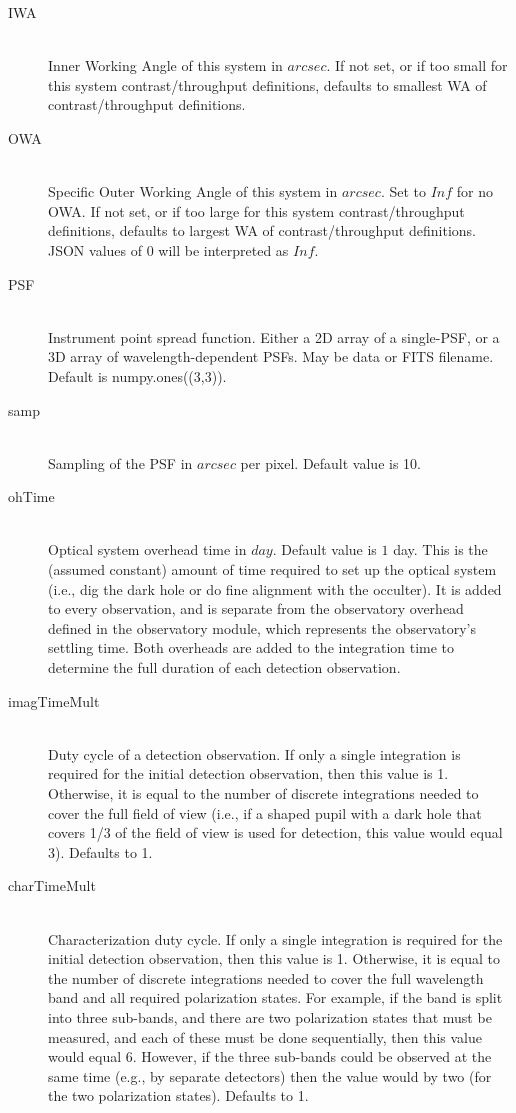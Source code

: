 \documentclass[cleanfoot]{asme2ej}
\begin{document}
\begin{itemize}
\begin{description}
\begin{description}
    \item[IWA] \hfill \\
     Inner Working Angle of this system in $ arcsec $. If not set, or if too small for this system contrast/throughput definitions, defaults to smallest WA of contrast/throughput definitions.
    \item[OWA] \hfill \\
    Specific Outer Working Angle of this system in $ arcsec $. Set to $ Inf $ for no OWA. If not set, or if too large for this system contrast/throughput definitions, defaults to largest WA of contrast/throughput definitions.  JSON values of $ 0 $ will be interpreted as $ Inf $.
    \item[PSF] \hfill \\
    Instrument point spread function. Either a 2D array of a single-PSF, or a 3D array of wavelength-dependent PSFs. May be data or FITS filename. Default is numpy.ones((3,3)).
    \item[samp] \hfill \\
    Sampling of the PSF in $ arcsec $ per pixel. Default value is 10.
    \item[ohTime] \hfill \\
    Optical system overhead time in $ day $.  Default value is $ 1 $ day.  This is the (assumed constant) amount of time required to set up the optical system (i.e., dig the dark hole or do fine alignment with the occulter).  It is added to every observation, and is separate from the observatory overhead defined in the observatory module, which represents the observatory's settling time.  Both overheads are added to the integration time to determine the full duration of each detection observation.
    \item[imagTimeMult]\hfill \\
    Duty cycle of a detection observation.  If only a single integration is required for the initial detection observation, then this value is 1.  Otherwise, it is equal to the number of discrete integrations needed to cover the full field of view (i.e., if a shaped pupil with a dark hole that covers 1/3 of the field of view is used for detection, this value would equal 3).  Defaults to 1.
    \item[charTimeMult]\hfill \\
    Characterization duty cycle.  If only a single integration is required for the initial detection observation, then this value is 1.  Otherwise, it is equal to the number of discrete integrations needed to cover the full wavelength band and all required polarization states.  For example, if the band is split into three sub-bands, and there are two polarization states that must be measured, and each of these must be done sequentially, then this value would equal 6.  However, if the three sub-bands could be observed at the same time (e.g., by separate detectors) then the value would by two (for the two polarization states). Defaults to 1.

\end{description}
\end{description}
\end{itemize}
\end{document}
